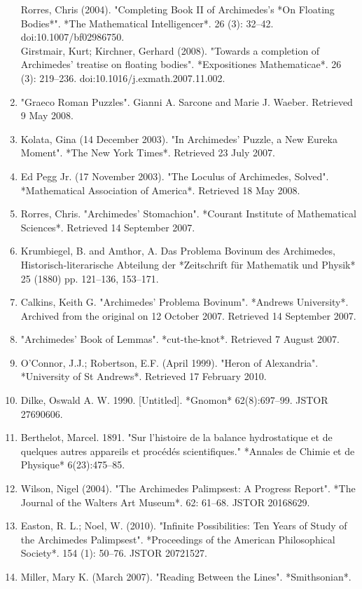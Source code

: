 \begin{enumerate}
Rorres, Chris (2004). "Completing Book II of Archimedes's *On Floating Bodies*". *The Mathematical Intelligencer*. 26 (3): 32–42. doi:10.1007/bf02986750.\\
Girstmair, Kurt; Kirchner, Gerhard (2008). "Towards a completion of Archimedes' treatise on floating bodies". *Expositiones Mathematicae*. 26 (3): 219–236. doi:10.1016/j.exmath.2007.11.002.
\item "Graeco Roman Puzzles". Gianni A. Sarcone and Marie J. Waeber. Retrieved 9 May 2008.
\item Kolata, Gina (14 December 2003). "In Archimedes' Puzzle, a New Eureka Moment". *The New York Times*. Retrieved 23 July 2007.
\item Ed Pegg Jr. (17 November 2003). "The Loculus of Archimedes, Solved". *Mathematical Association of America*. Retrieved 18 May 2008.
\item Rorres, Chris. "Archimedes' Stomachion". *Courant Institute of Mathematical Sciences*. Retrieved 14 September 2007.
\item Krumbiegel, B. and Amthor, A. Das Problema Bovinum des Archimedes, Historisch-literarische Abteilung der *Zeitschrift für Mathematik und Physik* 25 (1880) pp. 121–136, 153–171.
\item Calkins, Keith G. "Archimedes' Problema Bovinum". *Andrews University*. Archived from the original on 12 October 2007. Retrieved 14 September 2007.
\item "Archimedes' Book of Lemmas". *cut-the-knot*. Retrieved 7 August 2007.
\item O'Connor, J.J.; Robertson, E.F. (April 1999). "Heron of Alexandria". *University of St Andrews*. Retrieved 17 February 2010.
\item Dilke, Oswald A. W. 1990. [Untitled]. *Gnomon* 62(8):697–99. JSTOR 27690606.
\item Berthelot, Marcel. 1891. "Sur l'histoire de la balance hydrostatique et de quelques autres appareils et procédés scientifiques." *Annales de Chimie et de Physique* 6(23):475–85.
\item Wilson, Nigel (2004). "The Archimedes Palimpsest: A Progress Report". *The Journal of the Walters Art Museum*. 62: 61–68. JSTOR 20168629.
\item Easton, R. L.; Noel, W. (2010). "Infinite Possibilities: Ten Years of Study of the Archimedes Palimpsest". *Proceedings of the American Philosophical Society*. 154 (1): 50–76. JSTOR 20721527.
\item Miller, Mary K. (March 2007). "Reading Between the Lines". *Smithsonian*.

\end{enumerate}

